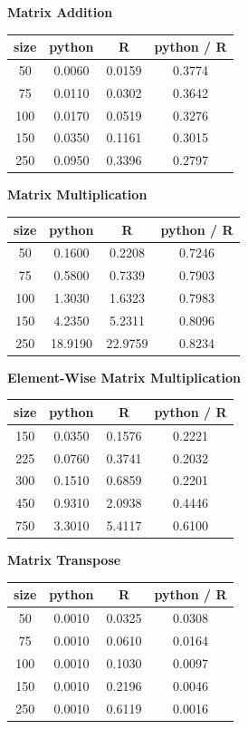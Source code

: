 \documentclass[%
        final,
        notitlepage,
        narroweqnarray,
        inline,
        ]{ieee}
\begin{document}
\begin{center}
  \vspace{1em}
    \textbf{Matrix Addition} \\
\begin{tabular}{cccc}
size  & python  &  R       & python / R \\
  \hline
50  & 0.0060 & 0.0159 & 0.3774 \\
75  & 0.0110 & 0.0302 & 0.3642 \\
100 & 0.0170 & 0.0519 & 0.3276 \\
150 & 0.0350 & 0.1161 & 0.3015 \\
250 & 0.0950 & 0.3396 & 0.2797 \\
\hline
\end{tabular}

\vspace{1em}
    \textbf{Matrix Multiplication} \\
\begin{tabular}{cccc}
size  & python  &  R       & python / R \\
  \hline
50  & 0.1600  & 0.2208  & 0.7246 \\
75  & 0.5800  & 0.7339  & 0.7903 \\
100 & 1.3030  & 1.6323  & 0.7983 \\
150 & 4.2350  & 5.2311  & 0.8096 \\
250 & 18.9190 & 22.9759 & 0.8234 \\
\end{tabular}

\vspace{1em}
    \textbf{Element-Wise Matrix Multiplication} \\
\begin{tabular}{cccc}
size  & python  &  R       & python / R \\
  \hline
150   & 0.0350  &  0.1576  &  0.2221 \\
225   & 0.0760  &  0.3741  &  0.2032 \\
300   & 0.1510  &  0.6859  &  0.2201 \\
450   & 0.9310  &  2.0938  &  0.4446 \\
750   & 3.3010  &  5.4117  &  0.6100 \\
\end{tabular}

\vspace{1em}
    \textbf{Matrix Transpose} \\
\begin{tabular}{cccc}
size  & python  &  R       & python / R \\
  \hline
50  & 0.0010  & 0.0325 & 0.0308 \\
75  & 0.0010  & 0.0610 & 0.0164 \\
100 & 0.0010  & 0.1030 & 0.0097 \\
150 & 0.0010  & 0.2196 & 0.0046 \\
250 & 0.0010  & 0.6119 & 0.0016 \\
\end{tabular}


\end{center}
\end{document}
